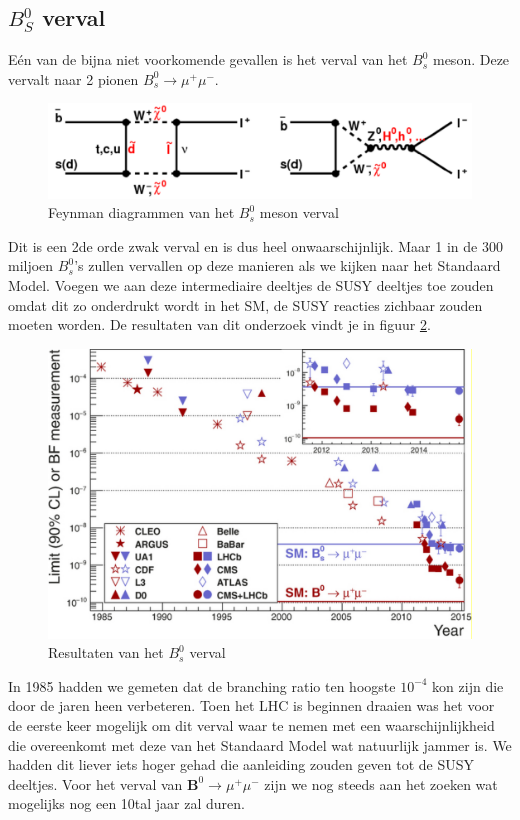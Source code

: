 \documentclass[../main.tex]{subfiles}
\begin{document}
\subsection{$B_S^0$ verval}%
\label{sub:_b_s_0_verval}

Eén van de bijna niet voorkomende gevallen is het verval van het $B_s^0$ meson. Deze vervalt naar 2 pionen $B_{s}^{0} \rightarrow \mu^{+} \mu^{-}$.

\begin{figure}[h]
    \centering
    \includegraphics[width=0.7\linewidth]{physics_beyond_the_standard_model/bs_meson_verval.png}
    \caption{Feynman diagrammen van het $B_s^0$ meson verval}%
    \label{fig:physics_beyond_the_standard_model/bs_meson_verval}
\end{figure}

Dit is een 2de orde zwak verval en is dus heel onwaarschijnlijk. Maar 1 in de 300 miljoen $B_s^0$'s zullen vervallen op deze manieren als we kijken naar het Standaard Model. Voegen we aan deze intermediaire deeltjes de SUSY deeltjes toe zouden omdat dit zo onderdrukt wordt in het SM, de SUSY reacties zichbaar zouden moeten worden. De resultaten van dit onderzoek vindt je in figuur \ref{fig:physics_beyond_the_standard_model/bs_meson_verval_resultaten}.

\begin{figure}[h]
    \centering
    \includegraphics[width=0.6\linewidth]{physics_beyond_the_standard_model/bs_meson_verval_resultaten.png}
    \caption{Resultaten van het $B_s^0$ verval}%
    \label{fig:physics_beyond_the_standard_model/bs_meson_verval_resultaten}
\end{figure}

In 1985 hadden we gemeten dat de branching ratio ten hoogste $10^{-4}$ kon zijn die door de jaren heen verbeteren. Toen het LHC is beginnen draaien was het voor de eerste keer mogelijk om dit verval waar te nemen met een waarschijnlijkheid die overeenkomt met deze van het Standaard Model wat natuurlijk jammer is. We hadden dit liever iets hoger gehad die aanleiding zouden geven tot de SUSY deeltjes. Voor het verval van $\mathbf{B}^{0} \rightarrow \mu^{+} \mu^-$ zijn we nog steeds aan het zoeken wat mogelijks nog een 10tal jaar zal duren.
\end{document}
